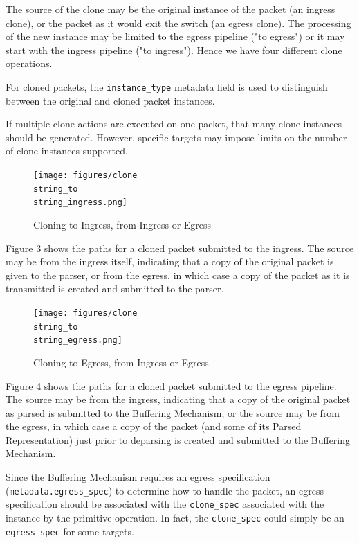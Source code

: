 \documentclass[12pt]{article}
\begin{document}
The source of the clone may be the original instance of the packet (an ingress
clone), or the packet as it would exit the switch (an egress clone). The processing
of the new instance may be limited to the egress pipeline ("to egress") or
it may start with the ingress pipeline ("to ingress").  Hence we have four
different clone operations.

For cloned packets, the \texttt{instance_type} metadata field is used to distinguish
between the original and cloned packet instances.

If multiple clone actions are executed on one packet, that many clone instances
should be generated.  However, specific targets may impose limits on the number
of clone instances supported.


\begin{figure}[h!]
    \centering
    \texttt{[image: figures/clone\\string\_to\\string\_ingress.png]}
    \caption{Cloning to Ingress, from Ingress or Egress}
    \label{fig:ingressclone}
\end{figure}


Figure 3 shows the paths for a cloned packet submitted to the ingress.  The
source may be from the ingress itself, indicating that a copy of the original
packet is given to the parser, or from the egress, in which case a copy of
the packet as it is transmitted is created and submitted to the parser.


\begin{figure}[h!]
    \centering
    \texttt{[image: figures/clone\\string\_to\\string\_egress.png]}
    \caption{Cloning to Egress, from Ingress or Egress}
    \label{fig:egressclone}
\end{figure}

Figure 4 shows the paths for a cloned packet submitted to the egress pipeline.
 The source may be from the ingress, indicating that a copy of the original
packet as parsed is submitted to the Buffering Mechanism; or the source may
be from the egress, in which case a copy of the packet (and some of its Parsed
Representation) just prior to deparsing is created and submitted to the Buffering
Mechanism.

Since the Buffering Mechanism requires an egress specification (\texttt{metadata.egress_spec})
to determine how to handle the packet, an egress specification should be associated
with the \texttt{clone_spec} associated with the instance by the primitive operation.
In fact, the \texttt{clone_spec} could simply be an \texttt{egress_spec} for some targets.
\end{document}
